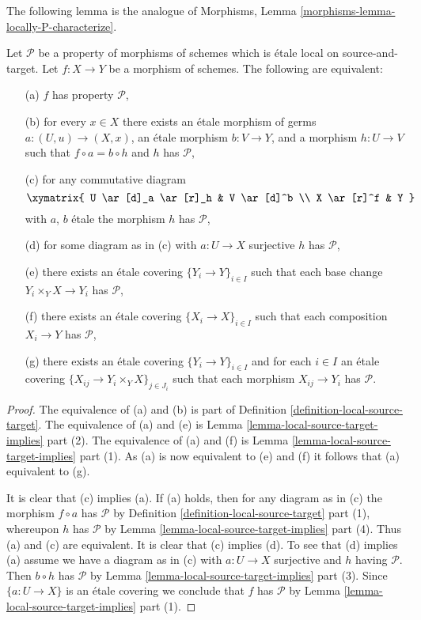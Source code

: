 \noindent
The following lemma is the analogue of
Morphisms, Lemma \ref{morphisms-lemma-locally-P-characterize}.

\begin{lemma}
\label{lemma-local-source-target-characterize}
Let $\mathcal{P}$ be a property of morphisms of schemes which is
\'etale local on source-and-target. Let $f : X \to Y$ be a morphism
of schemes. The following are equivalent:
\begin{enumerate}
\item[(a)] $f$ has property $\mathcal{P}$,
\item[(b)] for every $x \in X$ there exists an \'etale morphism of germs
$a : (U, u) \to (X, x)$, an \'etale morphism $b : V \to Y$, and
a morphism $h : U \to V$ such that $f \circ a = b \circ h$ and
$h$ has $\mathcal{P}$,
\item[(c)]
for any commutative diagram
$$
\xymatrix{
U \ar[d]_a \ar[r]_h & V \ar[d]^b \\
X \ar[r]^f & Y
}
$$
with $a$, $b$ \'etale the morphism $h$ has $\mathcal{P}$,
\item[(d)] for some diagram as in (c)
with $a : U \to X$ surjective $h$ has $\mathcal{P}$,
\item[(e)] there exists an \'etale covering $\{Y_i \to Y\}_{i \in I}$ such
that each base change $Y_i \times_Y X \to Y_i$ has $\mathcal{P}$,
\item[(f)] there exists an \'etale covering $\{X_i \to X\}_{i \in I}$ such
that each composition $X_i \to Y$ has $\mathcal{P}$,
\item[(g)] there exists an \'etale covering $\{Y_i \to Y\}_{i \in I}$ and
for each $i \in I$ an \'etale covering
$\{X_{ij} \to Y_i \times_Y X\}_{j \in J_i}$ such that each morphism
$X_{ij} \to Y_i$ has $\mathcal{P}$.
\end{enumerate}
\end{lemma}

\begin{proof}
The equivalence of (a) and (b) is part of
Definition \ref{definition-local-source-target}.
The equivalence of (a) and (e) is
Lemma \ref{lemma-local-source-target-implies} part (2).
The equivalence of (a) and (f) is
Lemma \ref{lemma-local-source-target-implies} part (1).
As (a) is now equivalent to (e) and (f) it follows that
(a) equivalent to (g).

\medskip\noindent
It is clear that (c) implies (a). If (a) holds, then for any
diagram as in (c) the morphism $f \circ a$ has $\mathcal{P}$ by
Definition \ref{definition-local-source-target} part (1),
whereupon $h$ has $\mathcal{P}$ by
Lemma \ref{lemma-local-source-target-implies} part (4).
Thus (a) and (c) are equivalent. It is clear that (c) implies (d).
To see that (d) implies (a) assume we have a diagram as in (c)
with $a : U \to X$ surjective and $h$ having $\mathcal{P}$.
Then $b \circ h$ has $\mathcal{P}$ by
Lemma \ref{lemma-local-source-target-implies} part (3).
Since $\{a : U \to X\}$ is an \'etale covering we conclude that
$f$ has $\mathcal{P}$ by
Lemma \ref{lemma-local-source-target-implies} part (1).
\end{proof}

